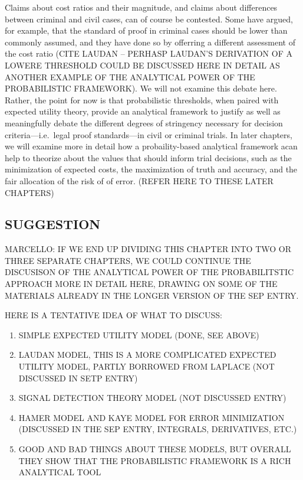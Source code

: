 \documentclass[10pt,dvipsnames,enabledeprecatedfontcommands]{scrartcl}
\begin{document}
\noindent Claims about cost ratios and their magnitude, and claims about
differences between criminal and civil cases, can of course be
contested. Some have argued, for example, that the standard of proof in
criminal cases should be lower than commonly assumed, and they have done
so by offerring a different assessment of the cost ratio (CITE LAUDAN --
PERHASP LAUDAN'S DERIVATION OF A LOWERE THRESHOLD COULD BE DISCUSSED
HERE IN DETAIL AS ANOTHER EXAMPLE OF THE ANALYTICAL POWER OF THE
PROBABILISTIC FRAMEWORK). We will not examine this debate here. Rather,
the point for now is that probabilistic thresholds, when paired with
expected utility theory, provide an analytical framework to justify as
well as meaningfully debate the different degrees of stringency
necessary for decision criteria---i.e.~legal proof standards---in civil
or criminal trials. In later chapters, we will examine more in detail
how a probaility-based analytical framework acan help to theorize about
the values that should inform trial decisions, such as the minimization
of expected costs, the maximization of truth and accuracy, and the fair
allocation of the risk of of error. (REFER HERE TO THESE LATER CHAPTERS)

\subsection{SUGGESTION}

MARCELLO: IF WE END UP DIVIDING THIS CHAPTER INTO TWO OR THREE SEPARATE
CHAPTERS, WE COULD CONTINUE THE DISCUSISON OF THE ANALYTICAL POWER OF
THE PROBABILITSTIC APPROACH MORE IN DETAIL HERE, DRAWING ON SOME OF THE
MATERIALS ALREADY IN THE LONGER VERSION OF THE SEP ENTRY.

HERE IS A TENTATIVE IDEA OF WHAT TO DISCUSS:

\begin{enumerate}
\def\labelenumi{(\arabic{enumi})}
\item
  SIMPLE EXPECTED UTILITY MODEL (DONE, SEE ABOVE)
\item
  LAUDAN MODEL, THIS IS A MORE COMPLICATED EXPECTED UTILITY MODEL,
  PARTLY BORROWED FROM LAPLACE (NOT DISCUSSED IN SETP ENTRY)
\item
  SIGNAL DETECTION THEORY MODEL (NOT DISCUSSED ENTRY)
\item
  HAMER MODEL AND KAYE MODEL FOR ERROR MINIMIZATION (DISCUSSED IN THE
  SEP ENTRY, INTEGRALS, DERIVATIVES, ETC.)
\item
  GOOD AND BAD THINGS ABOUT THESE MODELS, BUT OVERALL THEY SHOW THAT THE
  PROBABILISTIC FRAMEWORK IS A RICH ANALYTICAL TOOL
\end{enumerate}
\end{document}
